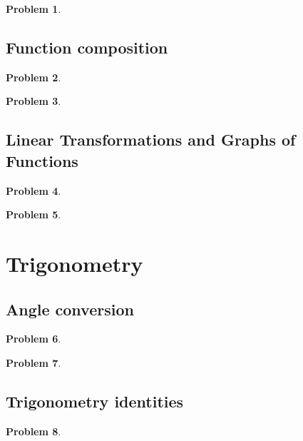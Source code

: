 \documentclass{article}
\newtheorem{problem}{Problem}
\begin{document}
\begin{problem}

\end{problem}

\subsection{Function composition}
\begin{problem}

\end{problem}
\begin{problem}

\end{problem}
\subsection{Linear Transformations and Graphs of Functions}
\begin{problem}

\end{problem}

\begin{problem}

\end{problem}



\section{Trigonometry}\label{secMPStrigonometry}
\subsection{Angle conversion}
\begin{problem}

\end{problem}
\begin{problem}

\end{problem}
\subsection{Trigonometry identities}
\begin{problem}

\end{problem}
\end{document}
